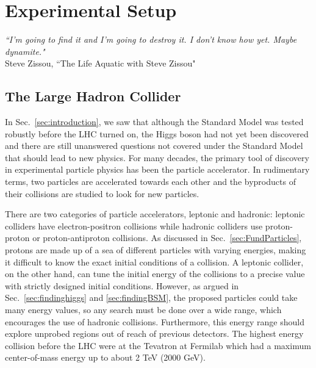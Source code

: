 \chapter{Experimental Setup}
\label{sec:expt}

\begin{center}
\begin{footnotesize}
{\it{``I'm going to find it and I'm going to destroy it. I don't know how yet. Maybe dynamite."}}\\
Steve Zissou, ``The Life Aquatic with Steve Zissou"
\end{footnotesize}
\end{center}

\section{The Large Hadron Collider}
\label{sec:LHC}

In Sec.~\ref{sec:introduction}, we saw that although the Standard Model was tested robustly before the LHC turned on, the Higgs boson had not yet been discovered and there are still unanswered questions not covered under the Standard Model that should lead to new physics. For many decades, the primary tool of discovery in experimental particle physics has been the particle accelerator. In rudimentary terms, two particles are accelerated towards each other and the byproducts of their collisions are studied to look for new particles.

There are two categories of particle accelerators, leptonic and hadronic: leptonic colliders have electron-positron collisions while hadronic colliders use proton-proton or proton-antiproton collisions. As discussed in Sec.~\ref{sec:FundParticles}, protons are made up of a sea of different particles with varying energies, making it difficult to know the exact initial conditions of a collision. A leptonic collider, on the other hand, can tune the initial energy of the collisions to a precise value with strictly designed initial conditions. However, as argued in Sec.~\ref{sec:findinghiggs} and \ref{sec:findingBSM}, the proposed particles could take many energy values, so any search must be done over a wide range, which encourages the use of hadronic collisions. Furthermore, this energy range should explore unprobed regions out of reach of previous detectors. The highest energy collision before the LHC were at the Tevatron at Fermilab which had a maximum center-of-mass energy up to about 2 TeV (2000 GeV).

